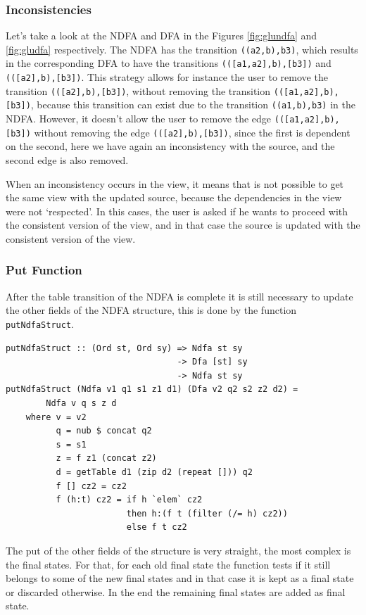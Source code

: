 \subsubsection{Inconsistencies}
Let's take a look at the NDFA and DFA in the Figures \ref{fig:glundfa} and \ref{fig:gludfa} respectively. The NDFA has the transition \texttt{((a2,b),b3)}, which results in the corresponding DFA to have the transitions \texttt{(([a1,a2],b),[b3])} and \texttt{(([a2],b),[b3])}. This strategy allows for instance the user to remove the transition \texttt{(([a2],b),[b3])}, without removing the transition \texttt{(([a1,a2],b),[b3])}, because this transition can exist due to the transition \texttt{((a1,b),b3)} in the NDFA. However, it doesn't allow the user to remove the edge \texttt{(([a1,a2],b),[b3])} without removing the edge \texttt{(([a2],b),[b3])}, since the first is dependent on the second, here we have again an inconsistency with the source, and the second edge is also removed.

When an inconsistency occurs in the view, it means that is not possible to get the same view with the updated source, because the dependencies in the view were not `respected'. In this cases, the user is asked if he wants to proceed with the consistent version of the view, and in that case the source is updated with the consistent version of the view.

\subsubsection{Put Function}
After the table transition of the NDFA is complete it is still necessary to update the other fields of the NDFA structure, this is done by the function \texttt{putNdfaStruct}.

\begin{verbatim}
putNdfaStruct :: (Ord st, Ord sy) => Ndfa st sy  
                                  -> Dfa [st] sy 
                                  -> Ndfa st sy
putNdfaStruct (Ndfa v1 q1 s1 z1 d1) (Dfa v2 q2 s2 z2 d2) = 
        Ndfa v q s z d
    where v = v2
          q = nub $ concat q2
          s = s1
          z = f z1 (concat z2)
          d = getTable d1 (zip d2 (repeat [])) q2
          f [] cz2 = cz2
          f (h:t) cz2 = if h `elem` cz2 
                        then h:(f t (filter (/= h) cz2))
                        else f t cz2
\end{verbatim}

The put of the other fields of the structure is very straight, the most complex is the final states. For that, for each old final state the function tests if it still belongs to some of the new final states and in that case it is kept as a final state or discarded otherwise. In the end the remaining final states are added as final state. 


